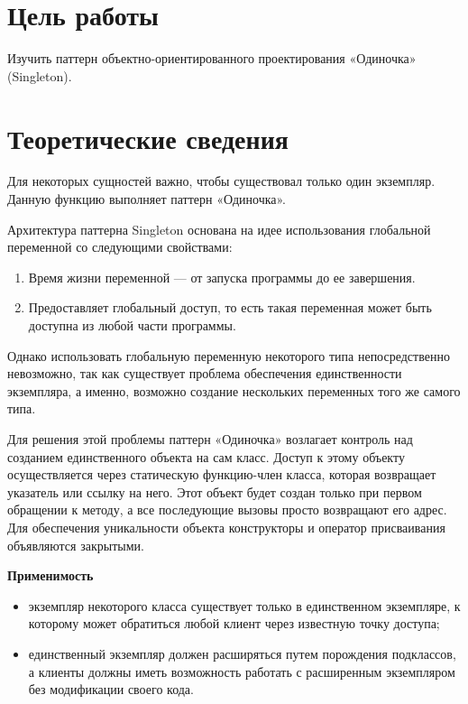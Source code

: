 \section{Цель работы}
Изучить паттерн объектно-ориентированного проектирования «Одиночка» \linebreak(Singleton).

\clearpage


\section{Теоретические сведения}

Для некоторых сущностей важно, чтобы существовал только один экземпляр. Данную функцию выполняет паттерн «Одиночка».

Архитектура паттерна Singleton основана на идее использования глобальной переменной со следующими свойствами:
\begin{enumerate}
    \item Время жизни переменной — от запуска программы до ее завершения.
    \item Предоставляет глобальный доступ, то есть такая переменная может быть доступна из любой части программы. 
\end{enumerate}

Однако использовать глобальную переменную некоторого типа непосредственно невозможно, так как существует проблема обеспечения единственности экземпляра, а именно, возможно создание нескольких переменных того же самого типа.

Для решения этой проблемы паттерн «Одиночка» возлагает контроль над созданием единственного объекта на сам класс. Доступ к этому объекту осуществляется через статическую функцию-член класса, которая возвращает указатель или ссылку на него. Этот объект будет создан только при первом обращении к методу, а все последующие вызовы просто возвращают его адрес. Для обеспечения уникальности объекта конструкторы и оператор присваивания объявляются закрытыми.

{\bf Применимость}
\begin{itemize}
    \item экземпляр некоторого класса существует только в единственном экземпляре, к которому может обратиться любой клиент через известную точку доступа;
    \item единственный экземпляр должен расширяться путем порождения подклассов, а клиенты должны иметь возможность работать с расширенным экземпляром без модификации своего кода.
\end{itemize}


